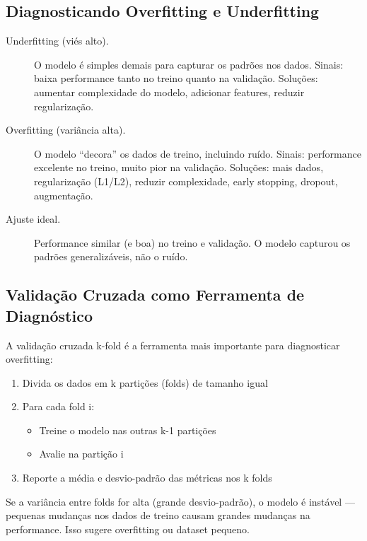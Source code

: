 \subsection{Diagnosticando Overfitting e Underfitting}

\begin{description}
    \item[Underfitting (viés alto).] O modelo é simples demais para capturar os padrões nos dados. Sinais: baixa performance tanto no treino quanto na validação. Soluções: aumentar complexidade do modelo, adicionar features, reduzir regularização.
    
    \item[Overfitting (variância alta).] O modelo ``decora'' os dados de treino, incluindo ruído. Sinais: performance excelente no treino, muito pior na validação. Soluções: mais dados, regularização (L1/L2), reduzir complexidade, early stopping, dropout, augmentação.
    
    \item[Ajuste ideal.] Performance similar (e boa) no treino e validação. O modelo capturou os padrões generalizáveis, não o ruído.
\end{description}

\subsection{Validação Cruzada como Ferramenta de Diagnóstico}

A validação cruzada k-fold  é a ferramenta mais importante para diagnosticar overfitting:

\begin{enumerate}
    \item Divida os dados em k partições (folds) de tamanho igual
    \item Para cada fold i:
    \begin{itemize}
        \item Treine o modelo nas outras k-1 partições
        \item Avalie na partição i
    \end{itemize}
    \item Reporte a média e desvio-padrão das métricas nos k folds
\end{enumerate}

Se a variância entre folds for alta (grande desvio-padrão), o modelo é instável — pequenas mudanças nos dados de treino causam grandes mudanças na performance. Isso sugere overfitting ou dataset pequeno.

